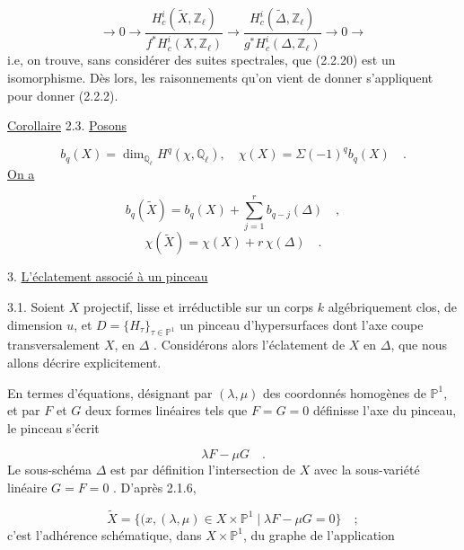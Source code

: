 \begin{equation}\tag{2.2.27}
\longrightarrow 0 \longrightarrow \frac{H^i_c(\widetilde{X},\mathbb{Z}_\ell)}{f^*H^i_c(X,\mathbb{Z}_\ell)} \longrightarrow \frac{H^i_c(\widetilde{\Delta},\mathbb{Z}_\ell)}{g^*H^i_c(\Delta,\mathbb{Z}_\ell)} \longrightarrow 0 \longrightarrow
\end{equation}
i.e, on trouve, sans considérer des suites spectrales, que (2.2.20) est un isomorphisme. Dès lors, les raisonnements qu'on vient de donner s'appliquent pour donner (2.2.2).

\underline{Corollaire} 2.3.  \underline{Posons}

\begin{equation*}
b_q(X) = \dim_{\mathbb{Q}_\ell} H^q(\chi,\mathbb{Q}_\ell), \quad \chi(X) = \Sigma(-1)^q b_q(X) \quad .
\end{equation*}
\underline{On a}

\begin{equation}\tag{2.3.1}
b_q(\widetilde{X}) = b_q(X) + \sum_{j=1}^{r} b_{q-j}(\Delta) \quad ,
\end{equation}
\begin{equation}\tag{2.3.2}
\chi(\widetilde{X}) = \chi(X) + r\,\chi(\Delta) \quad .
\end{equation}



3. \underline{L'éclatement associé à un pinceau}

3.1.  Soient $X$ projectif, lisse et irréductible sur un corps $k$ algébriquement clos, de dimension $u$, et $D = \{H_\tau\}_{\tau \in \mathbb{P}^1}$ un pinceau d'hypersurfaces dont l'axe coupe transversalement $X$, en $\Delta$ . Considérons alors l'éclatement de $X$ en $\Delta$, que nous allons décrire explicitement.

En termes d'équations, désignant par $(\lambda,\mu)$ des coordonnés homogènes de $\mathbb{P}^1$, et par $F$ et $G$ deux formes linéaires tels que $F = G = 0$ définisse l'axe du pinceau, le pinceau s'écrit

\begin{equation}\tag{3.1.1}
\lambda F - \mu G \quad .
\end{equation}
Le sous-schéma $\Delta$ est par définition l'intersection de $X$ avec la sous-variété linéaire $G = F = 0$ . D'après 2.1.6,

\begin{equation}\tag{3.1.2}
\widetilde{X} = \{(x,(\lambda,\mu) \in X \times \mathbb{P}^1 \mid \lambda F - \mu G = 0\} \quad ;
\end{equation}
c'est l'adhérence schématique, dans $X \times \mathbb{P}^1$, du graphe de l'application

